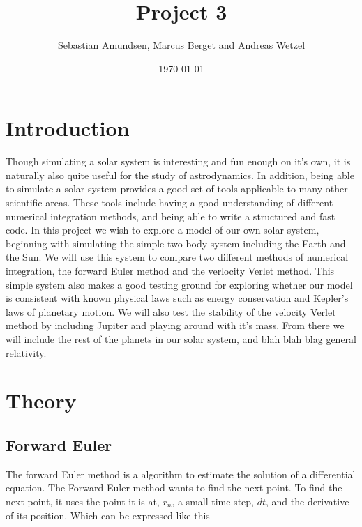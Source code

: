 \documentclass{article}
\begin{document}
\title{Project 3}
\author{Sebastian Amundsen, Marcus Berget and Andreas Wetzel}
\date{\today}

\maketitle

\begin{abstract}

\end{abstract}

\begin{multicols}{2}

\section{Introduction}

Though simulating a solar system is interesting and fun enough on it's own, it is naturally also quite useful for the study of astrodynamics. In addition, being able to simulate a solar system provides a good set of tools applicable to many other scientific areas. These tools include having a good understanding of different numerical integration methods, and being able to write a structured and fast code. In this project we wish to explore a model of our own solar system, beginning with simulating the simple two-body system including the Earth and the Sun. We will use this system to compare two different methods of numerical integration, the forward Euler method and the verlocity Verlet method. This simple system also makes a good testing ground for exploring whether our model is consistent with known physical laws such as energy conservation and Kepler's laws of planetary motion. We will also test the stability of the velocity Verlet method by including Jupiter and playing around with it's mass. From there we will include the rest of the planets in our solar system, and blah blah blag general relativity. 

\section{Theory}

\subsection{Forward Euler}
The forward Euler method is a algorithm to estimate the solution of a differential equation. The Forward Euler method wants to find the next point. To find the next point, it uses the point it is at, $r_n$, a small time step, $dt$, and the derivative of its position. Which can be expressed like this


\end{multicols}
\end{document}
